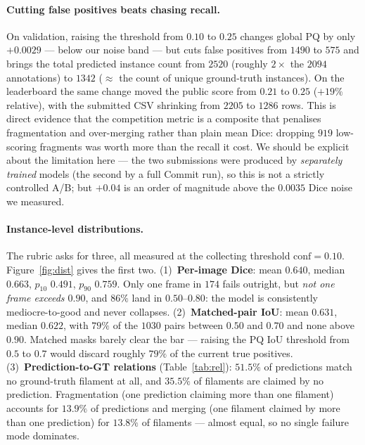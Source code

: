 \documentclass[sigconf]{acmart}
\begin{document}
\paragraph{Cutting false positives beats chasing recall.}
On validation, raising the threshold from $0.10$ to $0.25$ changes global PQ by only $+0.0029$ --- below our noise band --- but cuts false positives from $1490$ to $575$ and brings the total predicted instance count from $2520$ (roughly $2\times$ the $2094$ annotations) to $1342$ ($\approx$ the count of unique ground-truth instances). On the leaderboard the same change moved the public score from $0.21$ to $\mathbf{0.25}$ ($+19\%$ relative), with the submitted CSV shrinking from $2205$ to $1286$ rows. This is direct evidence that the competition metric is a composite that penalises fragmentation and over-merging rather than plain mean Dice: dropping $919$ low-scoring fragments was worth more than the recall it cost. We should be explicit about the limitation here --- the two submissions were produced by \emph{separately trained} models (the second by a full Commit run), so this is not a strictly controlled A/B; but $+0.04$ is an order of magnitude above the $0.0035$ Dice noise we measured.

\paragraph{Instance-level distributions.}
The rubric asks for three, all measured at the collecting threshold $\mathrm{conf}=0.10$. Figure~\ref{fig:dist} gives the first two. (1)~\textbf{Per-image Dice}: mean $0.640$, median $0.663$, $p_{10}$ $0.491$, $p_{90}$ $0.759$. Only one frame in $174$ fails outright, but \emph{not one frame exceeds $0.90$}, and $86\%$ land in $0.50$--$0.80$: the model is consistently mediocre-to-good and never collapses. (2)~\textbf{Matched-pair IoU}: mean $0.631$, median $0.622$, with $79\%$ of the $1030$ pairs between $0.50$ and $0.70$ and none above $0.90$. Matched masks barely clear the bar --- raising the PQ IoU threshold from $0.5$ to $0.7$ would discard roughly $79\%$ of the current true positives. (3)~\textbf{Prediction-to-GT relations} (Table~\ref{tab:rel}): $51.5\%$ of predictions match no ground-truth filament at all, and $35.5\%$ of filaments are claimed by no prediction. Fragmentation (one prediction claiming more than one filament) accounts for $13.9\%$ of predictions and merging (one filament claimed by more than one prediction) for $13.8\%$ of filaments --- almost equal, so no single failure mode dominates.
\end{document}
